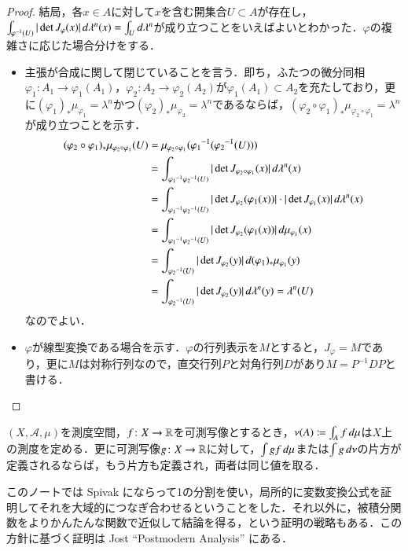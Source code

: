 \begin{proof}
結局，各$x \in A$に対して$x$を含む開集合$U \subset A$が存在し，$\int_{\varphi^{-1}(U)} |\det J_\varphi(x)| \mathop{}\!d \lambda^n(x) = \int_U \mathop{}\!d \lambda^n$が成り立つことをいえばよいとわかった．$\varphi$の複雑さに応じた場合分けをする．
\begin{itemize}
\item 主張が合成に関して閉じていることを言う．即ち，ふたつの微分同相$\varphi_1 \colon A_1 \to \varphi_1(A_1)$，$\varphi_2\colon A_2 \to \varphi_2(A_2)$が$\varphi_1(A_1) \subset A_2$を充たしており，更に$(\varphi_1)_* \mu_{\varphi_1} = \lambda^n$かつ$(\varphi_2)_* \mu_{\varphi_2} = \lambda^n$であるならば，$(\varphi_2 \circ \varphi_1)_* \mu_{\varphi_2 \circ \varphi_1} = \lambda^n$が成り立つことを示す．
\begin{align}
(\varphi_2 \circ \varphi_1)_* \mu_{\varphi_2 \circ \varphi_1} (U) &= \mu_{\varphi_2 \circ \varphi_1} ({\varphi_1}^{-1} ({\varphi_2}^{-1}(U))) \\
&= \int_{{\varphi_1}^{-1}{\varphi_2}^{-1}(U)} |\det J_{\varphi_2 \circ \varphi_1} (x)| \mathop{}\!d \lambda^n(x)\\
&= \int_{{\varphi_1}^{-1}{\varphi_2}^{-1}(U)} |\det J_{\varphi_2} ( \varphi_1 (x))| \cdot |\det J_{\varphi_1}(x)| \mathop{}\!d \lambda^n(x)\\
&=\int_{{\varphi_1}^{-1}{\varphi_2}^{-1}(U)} |\det J_{\varphi_2} ( \varphi_1 (x))| \mathop{}\!d \mu_{\varphi_1}(x)\\
&=\int_{{\varphi_2}^{-1}(U)} |\det J_{\varphi_2} (y)| \mathop{}\!d (\varphi_1)_*\mu_{\varphi_1}(y)\\
&=\int_{{\varphi_2}^{-1}(U)} |\det J_{\varphi_2} (y)| \mathop{}\!d \lambda^n(y) = \lambda^n(U)
\end{align}なのでよい．
\item $\varphi$が線型変換である場合を示す．$\varphi$の行列表示を$M$とすると，$J_\varphi = M$であり，更に$M$は対称行列なので，直交行列$P$と対角行列$D$があり$M = P^{-1}DP$と書ける．
\end{itemize}
\end{proof}

\begin{que}
$(X,\mathcal{A},\mu)$を測度空間，$f \colon X \to \mathbb{R}$を可測写像とするとき，$\nu(A) \coloneqq \int_A f \mathop{}\!d\mu$は$X$上の測度を定める．更に可測写像$g \colon X \to \mathbb{R}$に対して，$\int gf \mathop{}\!d \mu$または$\int g \mathop{}\!d \nu$の片方が定義されるならば，もう片方も定義され，両者は同じ値を取る．
\end{que}

\begin{que}[**]
このノートでは Spivak にならって1の分割を使い，局所的に変数変換公式を証明してそれを大域的につなぎ合わせるということをした．それ以外に，被積分関数をよりかんたんな関数で近似して結論を得る，という証明の戦略もある．この方針に基づく証明は Jost ``Postmodern Analysis'' にある．
\end{que}
